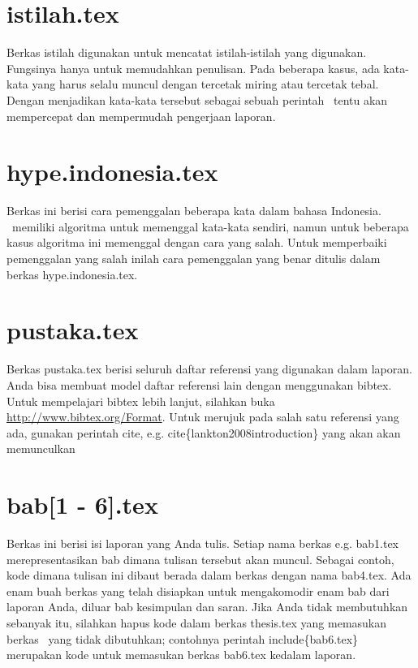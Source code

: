 \section{istilah.tex}
Berkas istilah digunakan untuk mencatat istilah-istilah yang digunakan. 
Fungsinya hanya untuk memudahkan penulisan.
Pada beberapa kasus, ada kata-kata yang harus selalu muncul dengan tercetak 
miring atau tercetak tebal. 
Dengan menjadikan kata-kata tersebut sebagai sebuah perintah \latex~tentu akan 
mempercepat dan mempermudah pengerjaan laporan. 


\section{hype.indonesia.tex}
Berkas ini berisi cara pemenggalan beberapa kata dalam bahasa Indonesia. 
\latex~memiliki algoritma untuk memenggal kata-kata sendiri, namun untuk 
beberapa kasus algoritma ini memenggal dengan cara yang salah. 
Untuk memperbaiki pemenggalan yang salah inilah cara pemenggalan yang benar 
ditulis dalam berkas hype.indonesia.tex.


\section{pustaka.tex}
Berkas pustaka.tex berisi seluruh daftar referensi yang digunakan dalam 
laporan. 
Anda bisa membuat model daftar referensi lain dengan menggunakan bibtex.
Untuk mempelajari bibtex lebih lanjut, silahkan buka 
\url{http://www.bibtex.org/Format}. 
Untuk merujuk pada salah satu referensi yang ada, gunakan perintah \bslash 
cite, e.g. \bslash cite\{lankton2008introduction\} yang akan akan memunculkan 
\cite{lankton2008introduction}


\section{bab[1 - 6].tex}
Berkas ini berisi isi laporan yang Anda tulis. 
Setiap nama berkas e.g. bab1.tex merepresentasikan bab dimana tulisan tersebut 
akan muncul. 
Sebagai contoh, kode dimana tulisan ini dibaut berada dalam berkas dengan nama 
bab4.tex. 
Ada enam buah berkas yang telah disiapkan untuk mengakomodir enam bab dari 
laporan Anda, diluar bab kesimpulan dan saran. 
Jika Anda tidak membutuhkan sebanyak itu, silahkan hapus kode dalam berkas 
thesis.tex yang memasukan berkas \latex~yang tidak dibutuhkan;  contohnya 
perintah \bslash include\{bab6.tex\} merupakan kode untuk memasukan berkas 
bab6.tex kedalam laporan.

